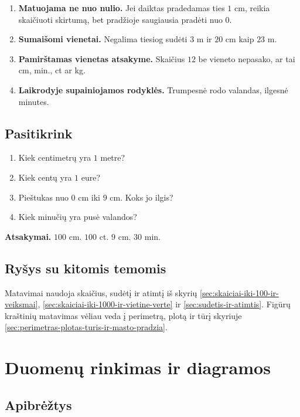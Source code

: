\begin{enumerate}
\item \textbf{Matuojama ne nuo nulio.} Jei daiktas pradedamas ties \(1\) cm, reikia skaičiuoti skirtumą, bet pradžioje saugiausia pradėti nuo \(0\).
\item \textbf{Sumaišomi vienetai.} Negalima tiesiog sudėti \(3\) m ir \(20\) cm kaip \(23\) m.
\item \textbf{Pamirštamas vienetas atsakyme.} Skaičius \(12\) be vieneto nepasako, ar tai cm, min., ct ar kg.
\item \textbf{Laikrodyje supainiojamos rodyklės.} Trumpesnė rodo valandas, ilgesnė minutes.
\end{enumerate}

\subsection{Pasitikrink}

\begin{enumerate}
\item Kiek centimetrų yra \(1\) metre?
\item Kiek centų yra \(1\) eure?
\item Pieštukas nuo \(0\) cm iki \(9\) cm. Koks jo ilgis?
\item Kiek minučių yra pusė valandos?
\end{enumerate}

\textbf{Atsakymai.} \(100\) cm. \(100\) ct. \(9\) cm. \(30\) min.

\subsection{Ryšys su kitomis temomis}

Matavimai naudoja skaičius, sudėtį ir atimtį iš skyrių \ref{sec:skaiciai-iki-100-ir-veiksmai}, \ref{sec:skaiciai-iki-1000-ir-vietine-verte} ir \ref{sec:sudetis-ir-atimtis}. Figūrų kraštinių matavimas vėliau veda į perimetrą, plotą ir tūrį skyriuje \ref{sec:perimetras-plotas-turis-ir-masto-pradzia}.

\section{Duomenų rinkimas ir diagramos}\label{sec:duomenu-rinkimas-ir-diagramos}

\subsection{Apibrėžtys}

